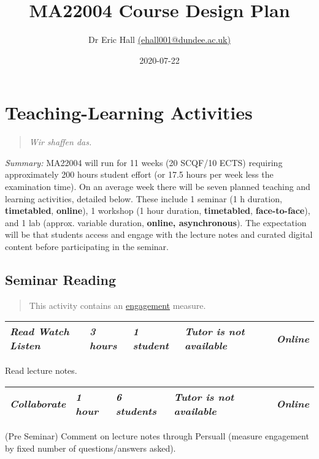\documentclass[
]{book}
\title{MA22004 Course Design Plan}
\author{Dr Eric Hall \href{mailto:ehall001@dundee.ac.uk}{(ehall001@dundee.ac.uk)}}
\date{2020-07-22}
\begin{document}
\maketitle

{
\setcounter{tocdepth}{1}
\tableofcontents
}
\hypertarget{learning}{%
\chapter{Teaching-Learning Activities}\label{learning}}

\begin{quote}
\emph{Wir shaffen das.}
\end{quote}

\emph{Summary:} MA22004 will run for 11 weeks (20 SCQF/10 ECTS) requiring approximately 200 hours student effort (or 17.5 hours per week less the examination time). On an average week there will be seven planned teaching and learning activities, detailed below. These include 1 seminar (1 h duration, \textbf{timetabled}, \textbf{online}), 1 workshop (1 hour duration, \textbf{timetabled}, \textbf{face-to-face}), and 1 lab (approx. variable duration, \textbf{online, asynchronous}). The expectation will be that students access and engage with the lecture notes and curated digital content before participating in the seminar.

\hypertarget{seminar-reading}{%
\section{Seminar Reading}\label{seminar-reading}}

\begin{quote}
This activity contains an \protect\hyperlink{engagement}{engagement} measure.
\end{quote}

\begin{longtable}[]{@{}lllll@{}}
\toprule
\endhead
\emph{Read Watch Listen} & \emph{3 hours} & \emph{1 student} & \emph{Tutor is not available} & \emph{Online}\tabularnewline
\bottomrule
\end{longtable}

Read lecture notes.

\begin{longtable}[]{@{}lllll@{}}
\toprule
\endhead
\emph{Collaborate} & \emph{1 hour} & \emph{6 students} & \emph{Tutor is not available} & \emph{Online}\tabularnewline
\bottomrule
\end{longtable}

(Pre Seminar) Comment on lecture notes through Persuall (measure
engagement by fixed number of questions/answers asked).
\end{document}
